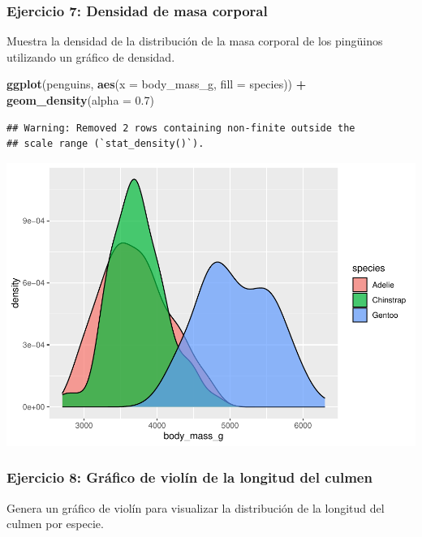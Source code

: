 \documentclass[
]{book}
\newenvironment{Shaded}{\begin{snugshade}}{\end{snugshade}}
\newcommand{\AttributeTok}[1]{\textcolor[rgb]{0.13,0.29,0.53}{#1}}
\newcommand{\FloatTok}[1]{\textcolor[rgb]{0.00,0.00,0.81}{#1}}
\newcommand{\FunctionTok}[1]{\textcolor[rgb]{0.13,0.29,0.53}{\textbf{#1}}}
\newcommand{\NormalTok}[1]{#1}
\newcommand{\SpecialCharTok}[1]{\textcolor[rgb]{0.81,0.36,0.00}{\textbf{#1}}}
\begin{document}
\subsubsection{Ejercicio 7: Densidad de masa corporal}\label{ejercicio-7-densidad-de-masa-corporal}

Muestra la densidad de la distribución de la masa corporal de los pingüinos utilizando un gráfico de densidad.

\begin{Shaded}
\begin{Highlighting}[]
\FunctionTok{ggplot}\NormalTok{(penguins, }\FunctionTok{aes}\NormalTok{(}\AttributeTok{x =}\NormalTok{ body\_mass\_g, }\AttributeTok{fill =}\NormalTok{ species)) }\SpecialCharTok{+}
  \FunctionTok{geom\_density}\NormalTok{(}\AttributeTok{alpha =} \FloatTok{0.7}\NormalTok{)}
\end{Highlighting}
\end{Shaded}

\begin{verbatim}
## Warning: Removed 2 rows containing non-finite outside the
## scale range (`stat_density()`).
\end{verbatim}

\includegraphics{bookdown-demo_files/figure-latex/unnamed-chunk-189-1.pdf}

\subsubsection{Ejercicio 8: Gráfico de violín de la longitud del culmen}\label{ejercicio-8-gruxe1fico-de-violuxedn-de-la-longitud-del-culmen}

Genera un gráfico de violín para visualizar la distribución de la longitud del culmen por especie.
\end{document}
